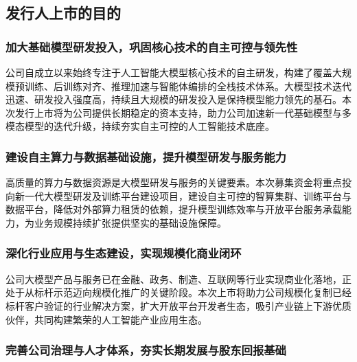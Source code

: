 
\subsection{发行人上市的目的}

\subsubsection{加大基础模型研发投入，巩固核心技术的自主可控与领先性}

公司自成立以来始终专注于人工智能大模型核心技术的自主研发，构建了覆盖大规
模预训练、后训练对齐、推理加速与智能体编排的全栈技术体系。大模型技术迭代
迅速、研发投入强度高，持续且大规模的研发投入是保持模型能力领先的基石。本
次发行上市将为公司提供长期稳定的资本支持，助力公司加速新一代基础模型与多
模态模型的迭代升级，持续夯实自主可控的人工智能技术底座。

\subsubsection{建设自主算力与数据基础设施，提升模型研发与服务能力}

高质量的算力与数据资源是大模型研发与服务的关键要素。本次募集资金将重点投
向新一代大模型研发及训练平台建设项目，建设自主可控的智算集群、训练平台与
数据平台，降低对外部算力租赁的依赖，提升模型训练效率与开放平台服务承载能
力，为业务规模持续扩张提供坚实的基础设施保障。

\subsubsection{深化行业应用与生态建设，实现规模化商业闭环}

公司大模型产品与服务已在金融、政务、制造、互联网等行业实现商业化落地，正
处于从标杆示范迈向规模化推广的关键阶段。本次上市将助力公司规模化复制已经
标杆客户验证的行业解决方案，扩大开放平台开发者生态，吸引产业链上下游优质
伙伴，共同构建繁荣的人工智能产业应用生态。

\subsubsection{完善公司治理与人才体系，夯实长期发展与股东回报基础}

